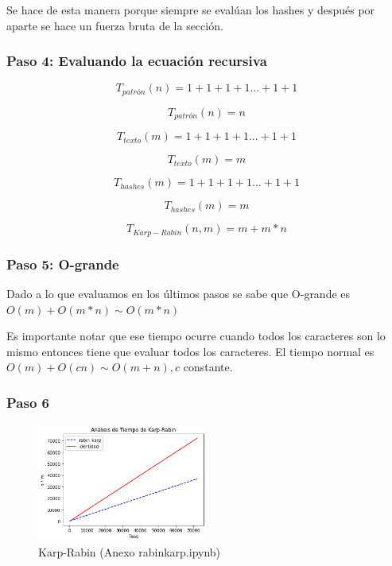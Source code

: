Se hace de esta manera porque siempre se evalúan los hashes y después por aparte se hace un fuerza bruta de la sección.
\subsubsection*{Paso 4: Evaluando la ecuación recursiva}

\[T_{patrón}(n) = 1 + 1 + 1 + 1 ... + 1 + 1\]

\[T_{patrón}(n) = n \]

\[T_{texto}(m) = 1 + 1 + 1 + 1 ... + 1 + 1\]

\[T_{texto}(m) = m \]

\[T_{hashes}(m) = 1 + 1 + 1 + 1 ... + 1 + 1\]

\[T_{hashes}(m) = m \]

\[T_{Karp-Rabin}(n,m) = m + m * n\]

\subsubsection*{Paso 5: O-grande}

Dado a lo que evaluamos en los últimos pasos se sabe que O-grande es $O(m) + O(m*n) \sim O(m*n)$

Es importante notar que ese tiempo ocurre cuando todos los caracteres son lo mismo entonces tiene que evaluar todos los caracteres. El tiempo normal es $O(m) + O(cn) \sim O(m+n), c$ constante.


\subsubsection*{Paso 6}
\begin{figure} [H]
    \includegraphics[width=0.5\textwidth]{../codigoPythonJupyter/rk/Final.png}
    \caption{Karp-Rabin (Anexo rabinkarp.ipynb)}
    \label{fig:kr}
\end{figure}
